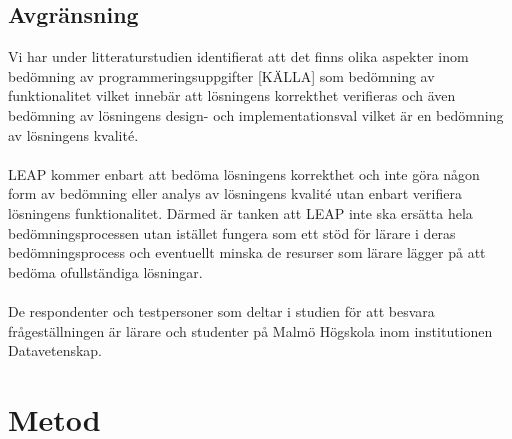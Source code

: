 \documentclass[a4paper,11pt]{article}
\begin{document}
{\subsection{Avgränsning}

Vi har under litteraturstudien identifierat att det finns olika aspekter inom bedömning av programmeringsuppgifter [KÄLLA] som bedömning av funktionalitet vilket innebär att lösningens korrekthet verifieras och även bedömning av lösningens design- och implementationsval vilket är en bedömning av lösningens kvalité. 
\\
\\
LEAP kommer enbart att bedöma lösningens korrekthet och inte göra någon form av bedömning eller analys av lösningens kvalité utan enbart verifiera lösningens funktionalitet. Därmed är tanken att LEAP inte ska ersätta hela bedömningsprocessen utan istället fungera som ett stöd för lärare i deras bedömningsprocess och eventuellt minska de resurser som lärare lägger på att bedöma ofullständiga lösningar.
\\
\\
De respondenter och testpersoner som deltar i studien för att besvara frågeställningen är lärare och studenter på Malmö Högskola inom institutionen Datavetenskap.

\newpage
\section{Metod}\label{Metod}

}
\end{document}
